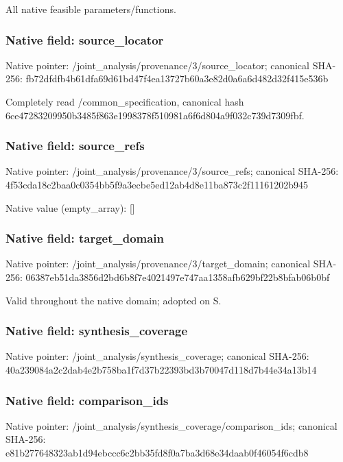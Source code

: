 \documentclass[10pt,a4paper]{article}
\begin{document}
\begingroup\raggedright\sloppy All native feasible parameters/\allowbreak{}functions.\par\endgroup

\subsubsection{Native field: source\_\allowbreak{}locator}
Native pointer: /joint\_\allowbreak{}analysis/provenance/3/source\_\allowbreak{}locator; canonical SHA-256: fb72dfdfb4b61dfa69d61bd47f4ea13727b60a3e82d0a6a6d482d32f415e536b

\begingroup\raggedright\sloppy Completely read /\allowbreak{}common\_\allowbreak{}specification,\allowbreak{} canonical hash 6ce47283209950b3485f863e1998378f510981a6f6d804a9f032c739d7309fbf.\par\endgroup

\subsubsection{Native field: source\_\allowbreak{}refs}
Native pointer: /joint\_\allowbreak{}analysis/provenance/3/source\_\allowbreak{}refs; canonical SHA-256: 4f53cda18c2baa0c0354bb5f9a3ecbe5ed12ab4d8e11ba873c2f11161202b945

Native value (empty\_\allowbreak{}array): []

\subsubsection{Native field: target\_\allowbreak{}domain}
Native pointer: /joint\_\allowbreak{}analysis/provenance/3/target\_\allowbreak{}domain; canonical SHA-256: 06387eb51da3856d2bd6b8f7e4021497e747aa1358afb629bf22b8bfab06b0bf

\begingroup\raggedright\sloppy Valid throughout the native domain;\allowbreak{} adopted on S.\par\endgroup

\subsubsection{Native field: synthesis\_\allowbreak{}coverage}
Native pointer: /joint\_\allowbreak{}analysis/synthesis\_\allowbreak{}coverage; canonical SHA-256: 40a239084a2c2dab4e2b758ba1f7d37b22393bd3b70047d118d7b44e34a13b14

\subsubsection{Native field: comparison\_\allowbreak{}ids}
Native pointer: /joint\_\allowbreak{}analysis/synthesis\_\allowbreak{}coverage/comparison\_\allowbreak{}ids; canonical SHA-256: e81b277648323ab1d94ebccc6c2bb35fd8f0a7ba3d68e34daab0f46054f6cdb8
\end{document}
